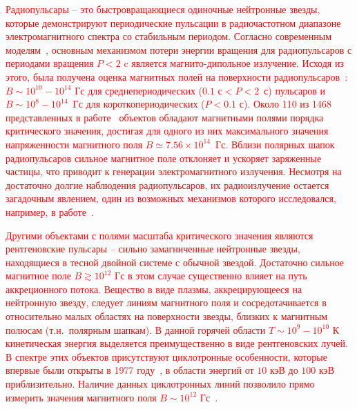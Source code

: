 \textcolor{red}{Радиопульсары -- это быстровращающиеся одиночные нейтронные 
звезды, которые демонстрируют периодические пульсации в радиочастотном 
диапазоне электромагнитного спектра со стабильным периодом. Согласно 
современным моделям~\cite{Gunn:1969,Pacini:1970}, основным механизмом потери 
энергии вращения для радиопульсаров с периодами вращения $P<2$ c является 
магнито-дипольное излучение. Исходя из этого, была получена оценка магнитных 
полей на поверхности радиопульсаров~\cite{Kim:2023}: $B\sim 10^{10}-10^{14}$ Гс 
для среднепериодических ($0.1\text{ с}<P<2$~с) пульсаров и 
$B\sim10^8-10^{14}$~Гс для короткопериодических ($P<0.1$ с). Около 110 из 1468 
представленных в работе~\cite{Kim:2023} объектов обладают магнитными полями 
порядка критического значения, достигая для одного из них максимального 
значения напряженности магнитного поля $B\simeq7.56 \times 10^{14}$~Гс. Вблизи 
полярных шапок радиопульсаров сильное магнитное поле отклоняет и ускоряет 
заряженные частицы, что приводит к генерации электромагнитного излучения.    
Несмотря на достаточно долгие наблюдения радиопульсаров, их радиоизлучение 
остается загадочным явлением, один из возможных механизмов которого 
исследовался, например, в работе~\cite{Philippov_2020}.}
	
\textcolor{red}{Другими объектами с полями масштаба критического значения 
являются рентгеновские пульсары -- сильно замагниченные нейтронные звезды, 
находящиеся в тесной двойной системе с обычной звездой. Достаточно сильное 
магнитное поле $B\gtrsim10^{12}$ Гс в этом случае существенно влияет на путь 
аккреционного потока. Вещество в виде плазмы, аккрецирующееся на нейтронную 
звезду, следует линиям магнитного поля и сосредотачивается в относительно малых 
областях на поверхности звезды, близких к магнитным полюсам (т.н.~полярным 
шапкам). В данной горячей области $T\sim10^9-10^{10}$ К кинетическая энергия 
выделяется преимущественно в виде рентгеновских лучей. В спектре этих объектов 
присутствуют циклотронные особенности, которые впервые были открыты в 1977 
году~\cite{Trumper:1977}, в области энергий от $10$ кэВ до $100$ кэВ 
приблизительно. Наличие данных циклотронных линий позволило прямо измерить 
значения магнитного поля $B\sim10^{12}$ Гс~\cite{Staubert:2019}.}
 


